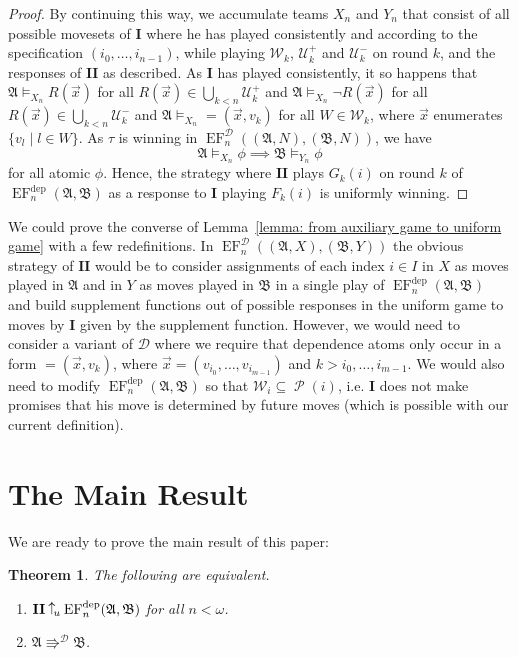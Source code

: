 \documentclass[10pt,a4paper]{amsart}
\newtheorem{theorem}[definition]{Theorem}
\newcommand{\wins}{\mathbin{\raisebox{0.8\depth}{$\uparrow$}}}
\newcommand{\playerone}{\mathrm{\mathbf{I}}}
\newcommand{\playertwo}{\mathrm{\mathbf{II}}}
\DeclareMathOperator{\EF}{EF}
\newcommand{\EFdep}{\EF^{\mathrm{dep}}}
\newcommand{\winsu}{\wins_{\!\textrm u}}
\newcommand{\W}{\mathcal W}
\newcommand{\U}{\mathcal U}
\newcommand{\A}{\mathfrak{A}}
\newcommand{\B}{\mathfrak{B}}
\newcommand{\dep}{\mathop{=}}
\newcommand{\posEquiv}{\mathbin{\Rrightarrow}}
\newcommand{\deplog}{\mathcal D}
\DeclareMathOperator{\Pow}{\mathcal{P}}
\begin{document}
\begin{proof}
    By continuing this way, we accumulate teams $X_n$ and $Y_n$ that consist of all possible movesets of $\playerone$ where he has played consistently and according to the specification $(i_0,\dots,i_{n-1})$, while playing $\W_k$, $\U^+_k$ and $\U^-_k$ on round $k$, and the responses of $\playertwo$ as described. As $\playerone$ has played consistently, it so happens that $\A\models_{X_n}R(\vec x)$ for all $R(\vec x)\in\bigcup_{k<n}\U^+_k$ and $\A\models_{X_n}\neg R(\vec x)$ for all $R(\vec x)\in\bigcup_{k<n}\U^-_k$ and $\A\models_{X_n}\dep(\vec x,v_k)$ for all $W\in\W_k$, where $\vec x$ enumerates $\{v_l \mid l\in W\}$. As $\tau$ is winning in $\EF_n^\deplog((\A,N),(\B,N))$, we have
    \[
        \A\models_{X_n}\phi \implies \B\models_{Y_n}\phi
    \]
    for all atomic $\phi$. Hence, the strategy where $\playertwo$ plays $G_k(i)$ on round $k$ of $\EFdep_n(\A,\B)$ as a response to $\playerone$ playing $F_k(i)$ is uniformly winning.
\end{proof}

We could prove the converse of Lemma~\ref{lemma: from auxiliary game to uniform game} with a few redefinitions. In $\EF_n^\deplog((\A,X),(\B,Y))$ the obvious strategy of $\playertwo$ would be to consider assignments of each index $i\in I$ in $X$ as moves played in $\A$ and in $Y$ as moves played in $\B$ in a single play of $\EFdep_n(\A,\B)$ and build supplement functions out of possible responses in the uniform game to moves by $\playerone$ given by the supplement function. However, we would need to consider a variant of $\deplog$ where we require that dependence atoms only occur in a form $\dep(\vec x, v_k)$, where $\vec x = (v_{i_0},\dots,v_{i_{m-1}})$ and $k>i_0,\dots,i_{m-1}$. We would also need to modify $\EFdep_n(\A,\B)$ so that $\W_i\subseteq\Pow(i)$, i.e. $\playerone$ does not make promises that his move is determined by future moves (which is possible with our current definition).





\section{The Main Result}\label{Uniform game vs. logic}

We are ready to prove the main result of this paper:


\begin{theorem}
    The following are equivalent.
    \begin{enumerate}
        \item\label{item: II wins uniformly for all n}
        $\playertwo\winsu\EFdep_n(\A,\B)$ for all $n<\omega$.
        \item\label{item: Dependence logic is preserved}
        $\A\posEquiv^\deplog\B$.
    \end{enumerate}
\end{theorem}
\end{document}
